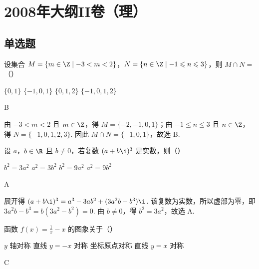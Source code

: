 \chapter{2008年大纲II卷（理）}

\section{单选题}

\begin{problem}
设集合 \(M = \{m \in \Z \mid -3 < m < 2\}\)，\(N = \{n \in \Z \mid -1 \leqslant n \leqslant 3\}\)，则 \(M \cap N =\)（\quad）

\choices
    {\(\{0,1\}\)}
    {\(\{-1, 0, 1\}\)}
    {\(\{0, 1, 2\}\)}
    {\(\{-1, 0, 1, 2\}\)}
\end{problem}

\begin{answer}
B
\end{answer}

\begin{solution}
由 \(-3<m<2\) 且 \(m\in\Z\)，得 \(M=\{-2,-1,0,1\}\)；由 \(-1\leqslant n\leqslant3\) 且 \(n\in\Z\)，得 \(N=\{-1,0,1,2,3\}\). 因此 \(M\cap N=\{-1,0,1\}\)，故选 B.
\end{solution}

\begin{problem}
设 \(a\)，\(b \in \R\) 且 \(b \neq 0\)，若复数 \((a + b\i)^3\) 是实数，则（\quad）

\choices
    {\( b^{2}=3a^{2} \)}
    {\(a^2 = 3b^2\)}
    {\( b^{2}=9a^{2} \)}
    {\(a^2 = 9b^2\)}
\end{problem}

\begin{answer}
A
\end{answer}

\begin{solution}
展开得 \((a+b\i)^3=a^3-3ab^2+(3a^2b-b^3)\i\). 该复数为实数，所以虚部为零，即 \(3a^2b-b^3=b(3a^2-b^2)=0\). 由 \(b\neq0\)，得 \(b^2=3a^2\)，故选 A.
\end{solution}

\begin{problem}
函数 \( f(x) = \frac{1}{x} - x \) 的图象关于（\quad）

\choices
    {\(y\) 轴对称}
    {直线 \( y = -x \) 对称}
    {坐标原点对称}
    {直线 \( y = x \) 对称}
\end{problem}

\begin{answer}
C
\end{answer}

